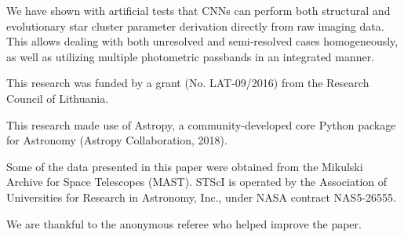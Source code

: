 \documentclass{aa}
\begin{document}
We have shown with artificial tests that CNNs can perform both structural and evolutionary star cluster parameter derivation directly from raw imaging data. This allows dealing with both unresolved and semi-resolved cases homogeneously, as well as utilizing multiple photometric passbands in an integrated manner.

\begin{acknowledgements}
This research was funded by a grant (No. LAT-09/2016) from the Research Council of Lithuania.

This research made use of Astropy, a community-developed core Python package for Astronomy (Astropy Collaboration, 2018).

Some of the data presented in this paper were obtained from the Mikulski Archive for Space Telescopes (MAST). STScI is operated by the Association of Universities for Research in Astronomy, Inc., under NASA contract NAS5-26555.

We are thankful to the anonymous referee who helped improve the paper.
\end{acknowledgements}


\end{document}
